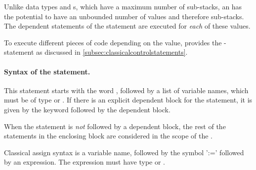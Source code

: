 Unlike data types and s, which have a maximum number of 
sub-stacks, an  has the potential to have 
 an unbounded number of values and therefore sub-stacks. 
The dependent statements of
 the  statement are executed for \emph{each} 
of these values.

To execute different pieces of code depending on the value, \lqpl{}
provides the  -  statement as discussed in
\vref{subsec:classicalcontrolstatements}.

\paragraph{Syntax of the  statement.} This statement starts with 
the word ,
 followed by a list of variable names, which must be  of
type  or . If there is an 
explicit dependent block for the statement, it is given by the
keyword  followed by the dependent block.

When the  statement is \emph{not} followed by a dependent block, 
the rest of the statements in the enclosing block are considered in
the scope of the .

Classical assign syntax is a variable name, followed by the 
symbol ':=' followed by an expression. The expression must have
type  or . 

